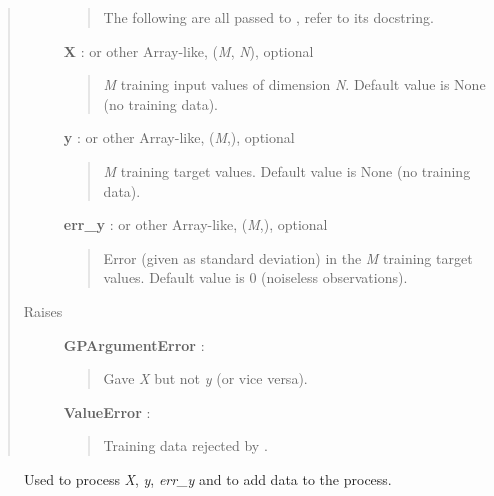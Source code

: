 \documentclass[letterpaper,10pt,english]{sphinxmanual}
\begin{document}
\begin{fulllineitems}
\begin{quote}
\begin{description}
\begin{quote}
The following are all passed to {\hyperref[gptools:gptools.gaussian_process.GaussianProcess.add_data]{}}, refer to its docstring.
\end{quote}

\textbf{X} :  or other Array-like, (\emph{M}, \emph{N}), optional
\begin{quote}

\emph{M} training input values of dimension \emph{N}. Default value is None (no
training data).
\end{quote}

\textbf{y} :  or other Array-like, (\emph{M},), optional
\begin{quote}

\emph{M} training target values. Default value is None (no training data).
\end{quote}

\textbf{err\_y} :  or other Array-like, (\emph{M},), optional
\begin{quote}

Error (given as standard deviation) in the \emph{M} training target values.
Default value is 0 (noiseless observations).
\end{quote}

\item[{Raises }] \leavevmode
\textbf{GPArgumentError} :
\begin{quote}

Gave \emph{X} but not \emph{y} (or vice versa).
\end{quote}

\textbf{ValueError} :
\begin{quote}

Training data rejected by {\hyperref[gptools:gptools.gaussian_process.GaussianProcess.add_data]{}}.
\end{quote}

\end{description}\end{quote}



\begin{description}
\item[{{\hyperref[gptools:gptools.gaussian_process.GaussianProcess.add_data]{}}}] \leavevmode
Used to process \emph{X}, \emph{y}, \emph{err\_y} and to add data to the process.

\end{description}



\end{fulllineitems}
\end{document}
